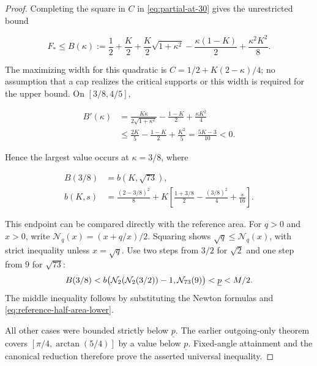 \begin{proof}
Completing the square in \(C\) in \eqref{eq:partial-at-30} gives the unrestricted bound

\begin{equation}\label{eq:partial-at-35}
F_*\le B(\kappa):=
\frac12+\frac K2+\frac K2\sqrt{1+\kappa^2}
-\frac{\kappa(1-K)}2+\frac{\kappa^2K^2}{8}.
\end{equation}

The maximizing width for this quadratic is
\(C=1/2+K(2-\kappa)/4\); no assumption that a cap realizes the
critical supports or this width is required for the upper bound.
On \([3/8,4/5]\),

\begin{equation}\label{eq:partial-at-36}
\begin{aligned}
B'(\kappa)
&=\frac{K\kappa}{2\sqrt{1+\kappa^2}}
-\frac{1-K}{2}+\frac{\kappa K^2}{4}\\
&\le\frac{2K}{5}-\frac{1-K}{2}+\frac{K^2}{5}
=\frac{5K-3}{10}<0.
\end{aligned}
\end{equation}

Hence the largest value occurs at \(\kappa=3/8\), where

\begin{equation}\label{eq:partial-at-37}
\begin{aligned}
B(3/8)&=b(K,\sqrt{73}),\\
b(K,s)&=\frac{(2-3/8)^2}{8}
 +K\left[\frac{1+3/8}{2}-\frac{(3/8)^2}{4}+\frac{s}{16}\right].
\end{aligned}
\end{equation}

This endpoint can be compared directly with the reference area. For $q>0$
and $x>0$, write $\mathcal N_q(x)=(x+q/x)/2$. Squaring shows
$\sqrt q\le\mathcal N_q(x)$, with strict inequality unless $x=\sqrt q$.
Use two steps from $3/2$ for $\sqrt2$ and one step from $9$ for $\sqrt{73}$:
\begin{equation}\label{eq:partial-at-38}
 B(3/8)
 <b\bigl(\mathcal N_2(\mathcal N_2(3/2))-1,
          \mathcal N_{73}(9)\bigr)
 <\underline p<M/2.
\end{equation}
The middle inequality follows by substituting the Newton formulas and
\cref{eq:reference-half-area-lower}.

All other cases were bounded strictly below \(\underline p\).
The earlier outgoing-only theorem covers
\([\pi/4,\arctan(5/4)]\) by a value below \(\underline p\).
Fixed-angle attainment and the canonical reduction therefore prove the
asserted universal inequality.

\end{proof}

